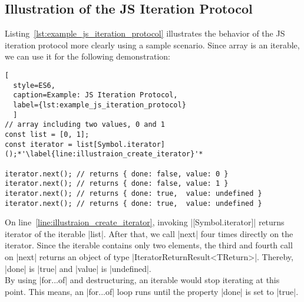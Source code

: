 \subsection{Illustration of the JS Iteration Protocol}
\label{sub:Illustration of the JS Iteration Protocol}
Listing~\ref{lst:example_js_iteration_protocol} illustrates the behavior of the
JS iteration protocol more clearly using a sample scenario. Since array is an
iterable, we can use it for the following demonstration:

\begin{lstlisting}[
  style=ES6, 
  caption=Example: JS Iteration Protocol,
  label={lst:example_js_iteration_protocol}
  ]
// array including two values, 0 and 1
const list = [0, 1];
const iterator = list[Symbol.iterator]();*'\label{line:illustraion_create_iterator}'*

iterator.next(); // returns { done: false, value: 0 }
iterator.next(); // returns { done: false, value: 1 }
iterator.next(); // returns { done: true,  value: undefined }
iterator.next(); // returns { done: true,  value: undefined }
\end{lstlisting}

On line~\ref{line:illustraion_create_iterator}, invoking |[Symbol.iterator]|
returns iterator of the iterable |list|. 
After that, we call |next| four times directly on the iterator. Since the
iterable contains only two elements, the third and fourth call on |next|
returns an object of type |IteratorReturnResult<TReturn>|. Thereby, |done| is
|true| and |value| is |undefined|. \\
By using |for...of| and destructuring, an iterable would stop iterating at this
point. This means, an |for...of| loop runs until the property |done| is set to
|true|.

